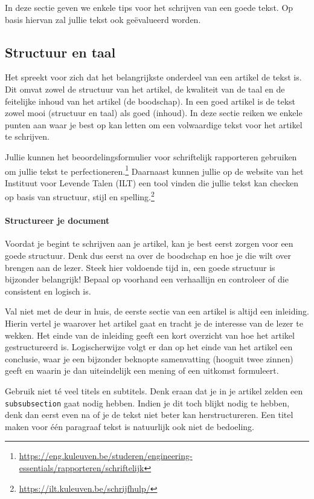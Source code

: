 \documentclass[a4paper]{article}
\begin{document}
In deze sectie geven we enkele tips voor het schrijven van een goede tekst.
Op basis hiervan zal jullie tekst ook ge\"evalueerd worden.


\subsection{Structuur en taal}

Het spreekt voor zich dat het belangrijkste onderdeel van een artikel de tekst is.
Dit omvat zowel de structuur van het artikel, de kwaliteit van de taal en de feitelijke inhoud van het artikel (de boodschap).
In een goed artikel is de tekst zowel mooi (structuur en taal) als goed (inhoud).
In deze sectie reiken we enkele punten aan waar je best op kan letten om een volwaardige tekst voor het artikel te schrijven.

Jullie kunnen het beoordelingsformulier voor schriftelijk rapporteren gebruiken om jullie tekst te perfectioneren.\footnote{\url{https://eng.kuleuven.be/studeren/engineering-essentials/rapporteren/schriftelijk}}
Daarnaast kunnen jullie op de website van het Instituut voor Levende Talen (ILT) een tool vinden die jullie tekst kan checken op basis van structuur, stijl en spelling.\footnote{\url{https://ilt.kuleuven.be/schrijfhulp/}}


\paragraph{Structureer je document}

Voordat je begint te schrijven aan je artikel, kan je best eerst zorgen voor een goede structuur.
Denk dus eerst na over de boodschap en hoe je die wilt over brengen aan de lezer.
Steek hier voldoende tijd in, een goede structuur is bijzonder belangrijk!
Bepaal op voorhand een verhaallijn en controleer of die consistent en logisch is.

Val niet met de deur in huis, de eerste sectie van een artikel is altijd een inleiding.
Hierin vertel je waarover het artikel gaat en tracht je de interesse van de lezer te wekken.
Het einde van de inleiding geeft een kort overzicht van hoe het artikel gestructureerd is.
Logischerwijze volgt er dan op het einde van het artikel een conclusie, waar je een bijzonder beknopte samenvatting (hooguit twee zinnen) geeft en waarin je dan uiteindelijk een mening of een uitkomst formuleert.

Gebruik niet t\'e veel titels en subtitels.
Denk eraan dat je in je artikel zelden een \texttt{\\subsubsection} gaat nodig hebben.
Indien je dit toch blijkt nodig te hebben, denk dan eerst even na of je de tekst niet beter kan herstructureren.
Een titel maken voor \'e\'en paragraaf tekst is natuurlijk ook niet de bedoeling.
\end{document}
